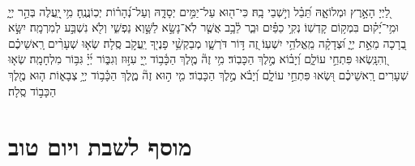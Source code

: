 \documentclass[twoside, openany, parskip=half, 11pt]{book}
\begin{document}
\begin{sometimes}

\\
%
לַ֭יְיָ הָאָ֣רֶץ וּמְלוֹאָ֑הּ תֵּ֝בֵ֗ל וְי֣שְׁבֵי בָֽהּ׃
כִּי־ה֖וּא עַל־יַמִּ֣ים יְסָדָ֑הּ וְעַל־נְ֝הָר֗וֹת יְכֽוֹנֲנֶֽהָ׃
מִ֥י ֖יַֽעֲלֶה בְּהַ֣ר יְיָ֑ וּמִ֥י־יָ֝ק֗וּם בִּמְק֥וֹם קָדְשֽׁוֹ׃
נְקִ֥י כַפַּ֗יִם וּבַ֢ר לֵ֫בָ֥ב אֲשֶׁ֤ר לֹֽא־נָשָׂ֣א לַשָּׁ֣וְא נַפְשִׁ֑י וְלֹ֖א נִשְׁבַּ֣ע לְמִרְמָֽה׃
יִשָּׂ֣א בְ֭רָכָה מֵאֵ֣ת יְיָ֑ וּ֝צְדָקָ֗ה מֵֽאֱלֹהֵ֥י יִשְׁעֽוֹ׃
זֶ֭ה דּ֣וֹר דֹּרְשָׁ֑ו מְבַקְשֵׁ֥֨י פָנֶי֖ךָ יַֽעֲקֹ֣ב סֶֽלָה׃
שְׂא֤וּ שְׁעָרִ֨ים רָֽאשֵׁיכֶ֗ם וְ֭הִנָּֽשְׂאוּ פִּתְחֵ֣י עוֹלָ֑ם וְ֝יָב֗וֹא מֶ֣לֶךְ הַכָּבֽוֹד׃
מִ֥י זֶה֘ מֶ֤לֶךְ הַכָּ֫ב֥וֹד יְ֖יָ עִזּ֣וּז וְגִבּ֑וֹר יְ֜יָ֗ גִּבּ֥וֹר מִלְחָמָֽה׃
שְׂא֤וּ שְׁעָרִים רָֽאשֵׁיכֶ֗ם וּ֭שְׂאוּ פִּתְחֵ֣י עוֹלָ֑ם וְ֝יָבֹ֗א מֶ֣לֶךְ הַכָּבֽוֹד׃
מִ֤י ה֣וּא זֶה֘ מֶ֢לֶךְ הַכָּ֫ב֥וֹד יְיָ֥ צְבָא֑וֹת ה֤וּא מֶ֖לֶךְ הַכָּב֣וֹד סֶֽלָה׃

\end{sometimes}



\etzchaim

\halfkaddish


\nextpage

\chapter[מוסף לשבת ויו״ט]{ מוסף לשבת ויום טוב }

\amidaopening{\shabbosshuva}{}
\nextpage

\end{document}
